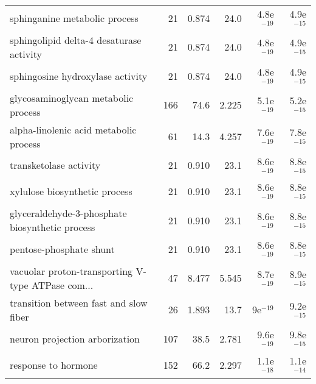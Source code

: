 \begin{longtable}{lrrrrr}
                     sphinganine metabolic process &                      21 &                   0.874 &       24.0 &         4.8e$^{-19}$ &         4.9e$^{-15}$ \\
          sphingolipid delta-4 desaturase activity &                      21 &                   0.874 &       24.0 &         4.8e$^{-19}$ &         4.9e$^{-15}$ \\
                  sphingosine hydroxylase activity &                      21 &                   0.874 &       24.0 &         4.8e$^{-19}$ &         4.9e$^{-15}$ \\
               glycosaminoglycan metabolic process &                     166 &                    74.6 &      2.225 &         5.1e$^{-19}$ &         5.2e$^{-15}$ \\
            alpha-linolenic acid metabolic process &                      61 &                    14.3 &      4.257 &         7.6e$^{-19}$ &         7.8e$^{-15}$ \\
                            transketolase activity &                      21 &                   0.910 &       23.1 &         8.6e$^{-19}$ &         8.8e$^{-15}$ \\
                     xylulose biosynthetic process &                      21 &                   0.910 &       23.1 &         8.6e$^{-19}$ &         8.8e$^{-15}$ \\
   glyceraldehyde-3-phosphate biosynthetic process &                      21 &                   0.910 &       23.1 &         8.6e$^{-19}$ &         8.8e$^{-15}$ \\
                           pentose-phosphate shunt &                      21 &                   0.910 &       23.1 &         8.6e$^{-19}$ &         8.8e$^{-15}$ \\
 vacuolar proton-transporting V-type ATPase com... &                      47 &                   8.477 &      5.545 &         8.7e$^{-19}$ &         8.9e$^{-15}$ \\
            transition between fast and slow fiber &                      26 &                   1.893 &       13.7 &           9e$^{-19}$ &         9.2e$^{-15}$ \\
                    neuron projection arborization &                     107 &                    38.5 &      2.781 &         9.6e$^{-19}$ &         9.8e$^{-15}$ \\
                               response to hormone &                     152 &                    66.2 &      2.297 &         1.1e$^{-18}$ &         1.1e$^{-14}$ \\

\end{longtable}
